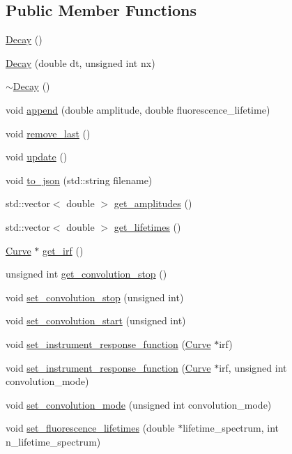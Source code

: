 \subsection*{Public Member Functions}
\begin{DoxyCompactItemize}
\item 
\hyperlink{class_decay_a603fb8ea4172c2c80c8779ad301b6a4f}{Decay} ()
\item 
\hyperlink{class_decay_a694e3127e3dd89affb983e9565781062}{Decay} (double dt, unsigned int nx)
\item 
\hyperlink{class_decay_a25561e44ddc6acc39078d1a3864d2289}{$\sim$\+Decay} ()
\item 
void \hyperlink{class_decay_a5880e6660875552ae7590227637eca9e}{append} (double amplitude, double fluorescence\+\_\+lifetime)
\item 
void \hyperlink{class_decay_a46e478fb53a701f9a33f33c8abe5caf9}{remove\+\_\+last} ()
\item 
void \hyperlink{class_decay_a9893be298ea279231a0476810d52f2d0}{update} ()
\item 
void \hyperlink{class_decay_afb84196cbc6cc532bf0ce5db85f39616}{to\+\_\+json} (std\+::string filename)
\item 
std\+::vector$<$ double $>$ \hyperlink{class_decay_a4e82ac52493fe7b56f023013c249de93}{get\+\_\+amplitudes} ()
\item 
std\+::vector$<$ double $>$ \hyperlink{class_decay_aaeb275e54ffc2de5bbe1df6e99221e7e}{get\+\_\+lifetimes} ()
\item 
\hyperlink{class_curve}{Curve} $\ast$ \hyperlink{class_decay_a538397addc1291d487ea446428dc989e}{get\+\_\+irf} ()
\item 
unsigned int \hyperlink{class_decay_ab0aa645c91bde2887b132af2f3ea97ed}{get\+\_\+convolution\+\_\+stop} ()
\item 
void \hyperlink{class_decay_a1ea9444adcde465036893d3ffd192e0c}{set\+\_\+convolution\+\_\+stop} (unsigned int)
\item 
void \hyperlink{class_decay_a9d989db5da823f4eb62b2bed6f20cd3d}{set\+\_\+convolution\+\_\+start} (unsigned int)
\item 
void \hyperlink{class_decay_a3765ed562358dcd7fac5ff5fcb13e477}{set\+\_\+instrument\+\_\+response\+\_\+function} (\hyperlink{class_curve}{Curve} $\ast$irf)
\item 
void \hyperlink{class_decay_ab19cff692097d1be4dc9e8c0047e077b}{set\+\_\+instrument\+\_\+response\+\_\+function} (\hyperlink{class_curve}{Curve} $\ast$irf, unsigned int convolution\+\_\+mode)
\item 
void \hyperlink{class_decay_a2a097da42db1a9e6cff3d82a03c04953}{set\+\_\+convolution\+\_\+mode} (unsigned int convolution\+\_\+mode)
\item 
void \hyperlink{class_decay_aaf3a26b7bce1d44a5330a636a0d87654}{set\+\_\+fluorescence\+\_\+lifetimes} (double $\ast$lifetime\+\_\+spectrum, int n\+\_\+lifetime\+\_\+spectrum)
\end{DoxyCompactItemize}
